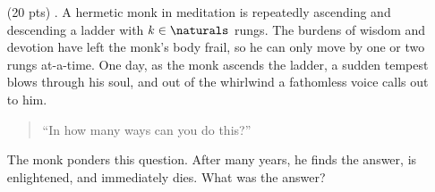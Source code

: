 \begin{enumerate}
  \item[(20 pts) \quad 5.]
    A hermetic monk in meditation is repeatedly ascending and descending a ladder with $k \in \naturals$ rungs.
    The burdens of wisdom and devotion have left the monk's body frail, so he can only move by one or two rungs at-a-time.
    One day, as the monk ascends the ladder, a sudden tempest blows through his soul, and out of the whirlwind a fathomless voice calls out to him.
    \begin{quote}
      ``In how many ways can you do this?''
    \end{quote}
    The monk ponders this question.
    After many years, he finds the answer, is enlightened, and immediately dies.
    What was the answer?

\end{enumerate}


